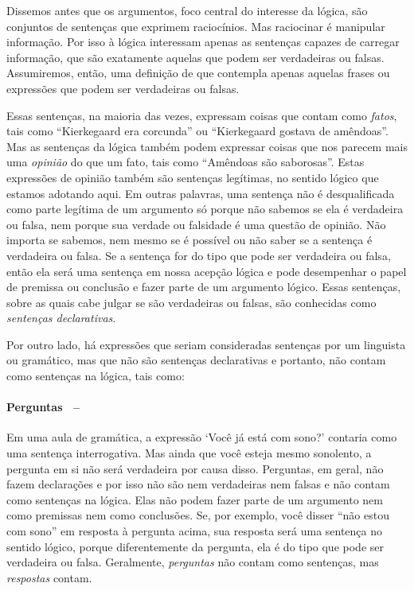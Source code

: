 
Dissemos antes que os argumentos, foco central do interesse da lógica, são conjuntos de sentenças que exprimem raciocínios.
Mas raciocinar é manipular informação.
Por isso à lógica interessam apenas as sentenças capazes de carregar informação, que são exatamente aquelas que podem ser verdadeiras ou falsas.
Assumiremos, então, uma definição de  que contempla apenas aquelas frases ou expressões que podem ser verdadeiras ou falsas.

Essas sentenças, na maioria das vezes, expressam coisas que contam como \textit{fatos}, tais como ``Kierkegaard era corcunda'' ou ``Kierkegaard gostava de amêndoas''.
Mas as sentenças da lógica também podem expressar coisas que nos parecem mais uma \textit{opinião} do que um fato, tais como ``Amêndoas são saborosas''.
Estas expressões de opinião também são sentenças legítimas, no sentido lógico que estamos adotando aqui.
Em outras palavras, uma sentença não é desqualificada como parte legítima de um argumento só porque não sabemos se ela é verdadeira ou falsa, nem porque sua verdade ou falsidade é uma questão de opinião.
Não importa se sabemos, nem mesmo se é possível ou não saber se a sentença é verdadeira ou falsa.
Se a sentença for do tipo que pode ser verdadeira ou falsa, então ela será uma sentença em nossa acepção lógica  e pode desempenhar o papel de premissa ou conclusão e fazer parte de um argumento lógico.
Essas sentenças, sobre as quais cabe julgar se são verdadeiras ou falsas, são conhecidas como \emph{sentenças declarativas}.

Por outro lado, há expressões que seriam consideradas sentenças por um linguista ou gramático, mas que não são sentenças declarativas e portanto, não contam como sentenças na lógica, tais como:

\paragraph{Perguntas \ --}Em uma aula de gramática, a expressão `Você já está com sono?'  contaria como uma sentença interrogativa. Mas ainda que você esteja mesmo sonolento, a pergunta em si não será verdadeira por causa disso.
Perguntas, em geral, não fazem declarações e por isso não são nem verdadeiras nem falsas e não contam como sentenças na lógica.
Elas não podem fazer parte de um argumento nem como premissas nem como conclusões.
Se, por exemplo, você disser ``não estou com sono'' em resposta à pergunta acima, sua resposta será uma sentença no sentido lógico, porque diferentemente da pergunta, ela é do tipo que pode ser verdadeira ou falsa.
Geralmente, \emph{perguntas} não contam como sentenças, mas \emph{respostas} contam.

